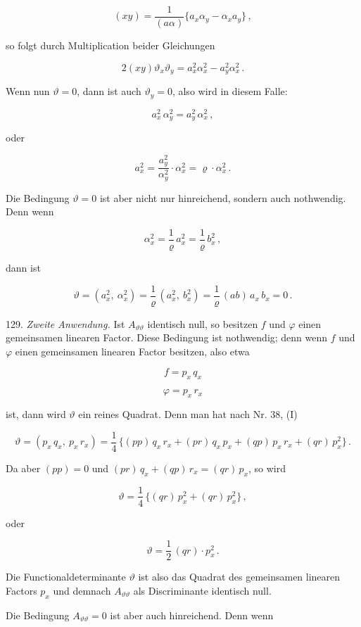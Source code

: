 \documentclass[11pt]{article}
\providecommand{\weberpage}[1]{}
\begin{document}
\[
(xy) = \frac{1}{(a\alpha)}\{a_x\alpha_y - \alpha_x a_y\}\,,
\]

so folgt durch Multiplication beider Gleichungen

\[
2(xy)\vartheta_x\vartheta_y = a_x^2\alpha_x^2 - a_y^2\alpha_x^2\,.
\]


\weberpage{144}

Wenn nun $\vartheta = 0$, dann ist auch $\vartheta_y = 0$, also wird in diesem Falle:

\[
a_x^2\,\alpha_y^2 = a_y^2\,\alpha_x^2\,,
\]

oder

\[
a_x^2 = \frac{a_y^2}{\alpha_y^2}\cdot\alpha_x^2 = \varrho\cdot\alpha_x^2\,.
\]

Die Bedingung $\vartheta = 0$ ist aber nicht nur hinreichend, sondern
auch nothwendig. Denn wenn

\[
\alpha_x^2 = \frac{1}{\varrho}\,a_x^2 = \frac{1}{\varrho}\,b_x^2\,,
\]

dann ist

\[
\vartheta = (a_x^2,\ \alpha_x^2) = \frac{1}{\varrho}\,(a_x^2,\ b_x^2) = \frac{1}{\varrho}\,(ab)\,a_x\,b_x = 0\,.
\]

129. \textit{Zweite Anwendung.} Ist $A_{\vartheta\vartheta}$ identisch null, so besitzen $f$ und
$\varphi$ einen gemeinsamen linearen Factor. Diese Bedingung ist nothwendig; denn wenn $f$ und $\varphi$ einen gemeinsamen linearen Factor besitzen, also etwa

\[
f = p_x\,q_x
\]

\[
\varphi = p_x\,r_x
\]

ist, dann wird $\vartheta$ ein reines Quadrat. Denn man hat nach Nr. 38, (I)

\[
\vartheta = (p_x\,q_x,\ p_x\,r_x) = \frac{1}{4}\,\{(pp)\,q_x\,r_x + (pr)\,q_x\,p_x + (qp)\,p_x\,r_x + (qr)\,p_x^2\}\,.
\]

Da aber $(pp) = 0$ und $(pr)\,q_x + (qp)\,r_x = (qr)\,p_x$, so wird

\[
\vartheta = \frac{1}{4}\,\{(qr)\,p_x^2 + (qr)\,p_x^2\}\,,
\]

oder

\[
\vartheta = \frac{1}{2}\,(qr)\cdot p_x^2\,.
\]

Die Functionaldeterminante $\vartheta$ ist also das Quadrat des gemeinsamen
linearen Factors $p_x$ und demnach $A_{\vartheta\vartheta}$ als Discriminante identisch null.

Die Bedingung $A_{\vartheta\vartheta} = 0$ ist aber auch hinreichend. Denn wenn
\end{document}
